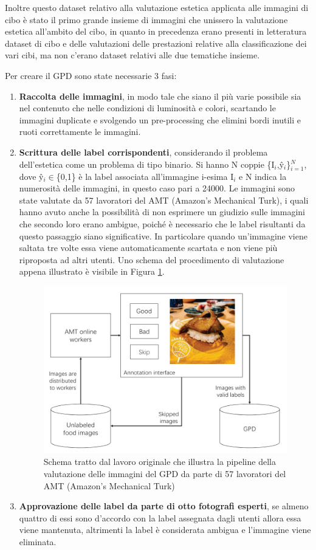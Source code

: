 Inoltre questo dataset relativo alla valutazione estetica applicata alle immagini di cibo è stato il primo grande insieme di immagini che unissero la valutazione estetica all'ambito del cibo, in quanto in precedenza erano presenti in letteratura dataset di cibo e delle valutazioni delle prestazioni relative alla classificazione dei vari cibi, ma non c'erano dataset relativi alle due tematiche insieme.

Per creare il GPD sono state necessarie 3 fasi:
\begin{enumerate}
	\item \textbf{Raccolta delle immagini}, in modo tale che siano il più varie possibile sia nel contenuto che nelle condizioni di luminosità e colori, scartando le immagini duplicate e svolgendo un pre-processing che elimini bordi inutili e ruoti correttamente le immagini.
	\item \textbf{Scrittura delle label corrispondenti}, considerando il problema dell'estetica come un problema di tipo binario. Si hanno N coppie \{I$_{i}$,\^{y$_{i}$}\}$^{N}_{i=1}$, dove \^{y$_{i}$}$\in$\{0,1\} è la label associata all'immagine i-esima I$_{i}$ e N indica la numerosità delle immagini, in questo caso pari a 24000. Le immagini sono state valutate da 57 lavoratori del AMT (Amazon’s Mechanical Turk), i quali hanno avuto anche la possibilità di non esprimere un giudizio sulle immagini che secondo loro erano ambigue, poiché è necessario che le label risultanti da questo passaggio siano significative. In particolare quando un'immagine viene saltata tre volte essa viene automaticamente scartata e non viene più riproposta ad altri utenti. Uno schema del procedimento di valutazione appena illustrato è visibile in Figura \ref{pipeline}.
\begin{figure}[H]
\centering
\includegraphics[scale=0.95]{images/pipeline.png}\caption{Schema tratto dal lavoro originale \cite{sheng2021learning} che illustra la pipeline della valutazione delle immagini del GPD da parte di 57 lavoratori del AMT (Amazon’s Mechanical Turk)}
\label{pipeline}
\end{figure}
	\item \textbf{Approvazione delle label da parte di otto fotografi esperti}, se almeno quattro di essi sono d'accordo con la label assegnata dagli utenti allora essa viene mantenuta, altrimenti la label è considerata ambigua e l'immagine viene eliminata.
\end{enumerate}
